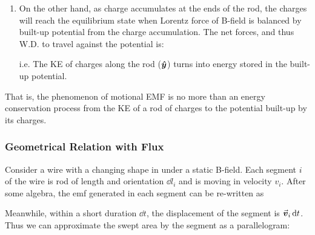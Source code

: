\documentclass[class=article, crop=false, 12pt]{standalone}
\begin{document}
\begin{enumerate}

    \item On the other hand, as charge accumulates at the ends of the rod,
    the charges will reach the equilibrium state when 
    Lorentz force of B-field is balanced by built-up potential from the charge accumulation. 
    The net forces, and thus W.D. to travel against the potential is:
    

    i.e. The KE of charges along the rod ($\vu*{y}$) turns into energy stored in the built-up potential.

    
\end{enumerate}

That is, the phenomenon of motional EMF is no more than an energy conservation process from
the KE of a rod of charges to the potential built-up by its charges.





\subsubsection{Geometrical Relation with Flux}

Consider a wire with a changing shape in under a static B-field. 
Each segment $i$ of the wire is rod of length and orientation $\dd{l_i}$ and 
is moving in velocity $v_i$.
After some algebra, the emf generated in each segment can be re-written as 

Meanwhile, within a short duration $\dd{t}$,
the displacement of the segment is $\va*{v}_i\dd{t}$.
Thus we can approximate the swept area by the segment as a parallelogram:
\end{document}
